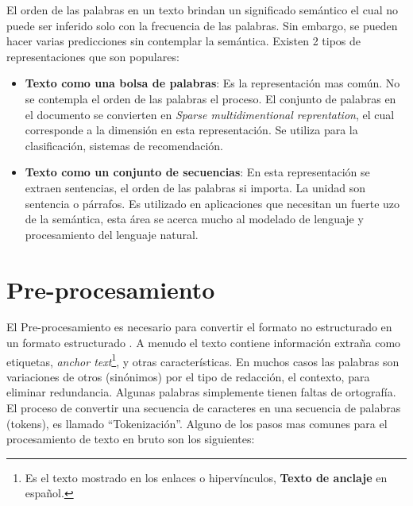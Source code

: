 El orden de las palabras en un texto brindan un significado semántico el cual no puede ser inferido  solo con la frecuencia de las palabras. Sin embargo, se pueden hacer varias predicciones sin contemplar la semántica. Existen 2 tipos de representaciones que son populares:

\begin{itemize}
	
	\item \textbf{Texto como una bolsa de palabras}: Es la representación mas común. No se contempla el orden de las palabras el proceso. El conjunto de palabras en el documento se convierten en \textit{Sparse multidimentional reprentation}, el cual corresponde a la dimensión en esta representación. Se utiliza para la clasificación, sistemas de recomendación.

	\item \textbf{Texto como un conjunto de secuencias}: En esta representación se extraen sentencias, el orden de las palabras si importa. La unidad son sentencia o párrafos. Es utilizado en aplicaciones que necesitan un fuerte uzo de la semántica, esta área se acerca mucho al modelado de lenguaje y procesamiento del lenguaje natural.

\end{itemize}


\section[Pre-procesamiento]{Pre-procesamiento}

El Pre-procesamiento es necesario para convertir el formato no estructurado en un formato estructurado \citep{CD1}.
A menudo el texto contiene información extraña como etiquetas, \textit{anchor text}\footnote{Es el texto mostrado en los enlaces o hipervínculos, \textbf{Texto de anclaje} en español.}, y otras características. En muchos casos las palabras son variaciones de otros (sinónimos) por el tipo de redacción, el contexto, para eliminar redundancia. Algunas palabras simplemente tienen faltas de ortografía. El proceso de convertir una secuencia de caracteres en una secuencia de palabras (tokens), es llamado ``Tokenización''. Alguno de los pasos mas comunes para el procesamiento de texto en bruto son los siguientes: 

